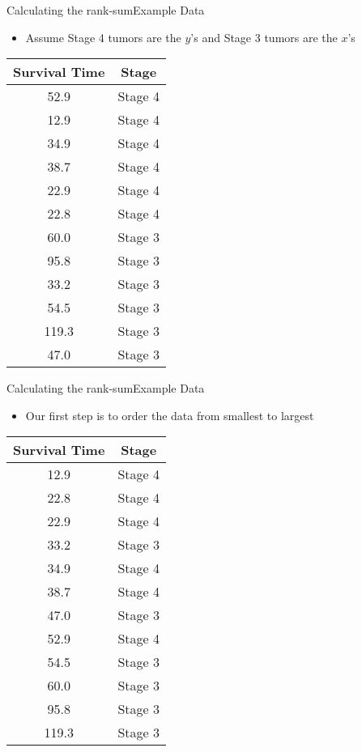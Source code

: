 \documentclass[xcolor=dvipsnames]{beamer}
\begin{document}
\begin{frame}{Calculating the rank-sum}{Example Data}
\begin{itemize}
	\item Assume Stage 4 tumors are the $y$'s and Stage 3 tumors are the $x$'s
\end{itemize}
	\begin{center}
		\begin{tabular}{|c|c|}
			\hline
			    \textbf{Survival Time} &  \textbf{Stage} \\ \hline \hline
			52.9  &Stage 4 \\ \hline
			12.9 &Stage 4 \\ \hline
		    34.9& Stage 4 \\ \hline
		    38.7 &Stage 4 \\ \hline
			  22.9& Stage 4 \\ \hline
		   22.8 &Stage 4 \\ \hline
		   60.0 &Stage 3 \\ \hline
			  95.8& Stage 3 \\ \hline
		   33.2 &Stage 3 \\ \hline
			  54.5 &Stage 3 \\ \hline
			 119.3 &Stage 3 \\ \hline
			  47.0 &Stage 3 \\ \hline
		\end{tabular}
	\end{center}
\end{frame}

\begin{frame}{Calculating the rank-sum}{Example Data}
\begin{itemize}
	\item Our first step is to order the data from smallest to largest
\end{itemize}
\begin{center}
	\begin{tabular}{|c|c|}
		\hline
		\textbf{Survival Time} &  \textbf{Stage} \\ \hline \hline
		12.9 &Stage 4 \\ \hline
		22.8 &Stage 4 \\ \hline
		22.9& Stage 4 \\ \hline
		33.2 &Stage 3 \\ \hline
		34.9& Stage 4 \\ \hline
		38.7 &Stage 4 \\ \hline
		47.0 &Stage 3 \\ \hline		
		52.9  &Stage 4 \\ \hline
		54.5 &Stage 3 \\ \hline				
		60.0 &Stage 3 \\ \hline
		95.8& Stage 3 \\ \hline
		119.3 &Stage 3 \\ \hline
	\end{tabular}
\end{center}
\end{frame}
\end{document}
